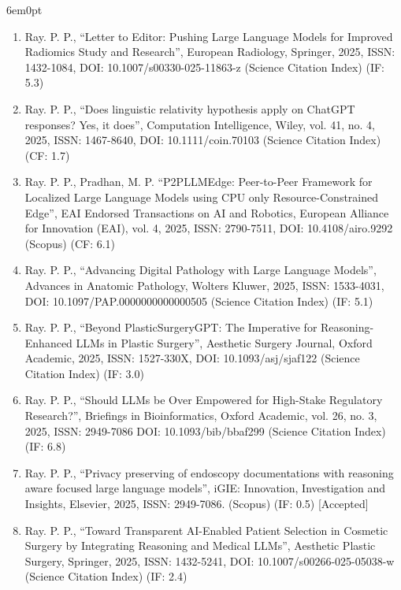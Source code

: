 \documentclass[11pt,a4paper]{moderncv}
\begin{document}
\begin{adjustwidth}{6em}{0pt}
\begin{enumerate}
		\item Ray. P. P., “Letter to Editor: Pushing Large Language Models for Improved Radiomics Study and Research”, European Radiology, Springer, 2025, ISSN: 1432-1084, DOI: 10.1007/s00330-025-11863-z (Science Citation Index) (IF: 5.3)
		
		\item Ray. P. P., “Does linguistic relativity hypothesis apply on ChatGPT responses? Yes, it does”, Computation Intelligence, Wiley, vol. 41, no. 4, 2025, ISSN: 1467-8640, DOI: 10.1111/coin.70103 (Science Citation Index) (CF: 1.7)
		
		\item Ray. P. P., Pradhan, M. P. “P2PLLMEdge: Peer-to-Peer Framework for Localized Large Language Models using CPU only Resource-Constrained Edge”, EAI Endorsed Transactions on AI and Robotics, European Alliance for Innovation (EAI), vol. 4, 2025, ISSN: 2790-7511, DOI: 10.4108/airo.9292 (Scopus) (CF: 6.1)
		
		\item Ray. P. P., “Advancing Digital Pathology with Large Language Models”, Advances in Anatomic Pathology, Wolters Kluwer, 2025, ISSN: 1533-4031, DOI: 10.1097/PAP.0000000000000505 (Science Citation Index) (IF: 5.1)
		
		\item Ray. P. P., “Beyond PlasticSurgeryGPT: The Imperative for Reasoning-Enhanced LLMs in Plastic Surgery”, Aesthetic Surgery Journal, Oxford Academic, 2025, ISSN: 1527-330X, DOI: 10.1093/asj/sjaf122 (Science Citation Index) (IF: 3.0)
		
		\item Ray. P. P., “Should LLMs be Over Empowered for High-Stake Regulatory Research?”, Briefings in Bioinformatics, Oxford Academic, vol. 26, no. 3, 2025, ISSN: 2949-7086 DOI: 10.1093/bib/bbaf299 (Science Citation Index) (IF: 6.8)
		
		\item Ray. P. P., “Privacy preserving of endoscopy documentations with reasoning aware focused large language models”, iGIE: Innovation, Investigation and Insights, Elsevier, 2025, ISSN: 2949-7086. (Scopus) (IF: 0.5) [Accepted]
		
		\item Ray. P. P., “Toward Transparent AI-Enabled Patient Selection in Cosmetic Surgery by Integrating Reasoning and Medical LLMs”, Aesthetic Plastic Surgery, Springer, 2025, ISSN: 1432-5241, DOI: 10.1007/s00266-025-05038-w (Science Citation Index) (IF: 2.4) 
		

\end{enumerate}
\end{adjustwidth}
\end{document}
